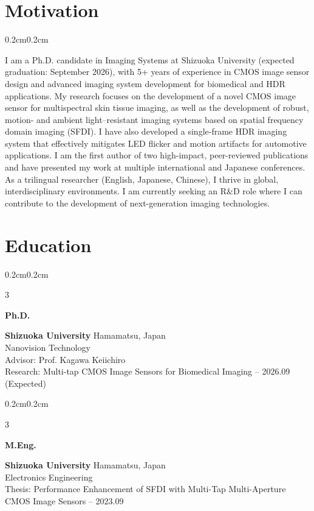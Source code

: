 \documentclass[10pt, letterpaper]{article}
\newenvironment{onecolentry}{
    \begin{adjustwidth}{0.2cm}{0.2cm}
}{\end{adjustwidth}}
\newenvironment{threecolentry}[3][]{
    \onecolentry
    \def\thirdColumn{#3}
    \setcolumnwidth{1cm, \fill, 3.2cm}
    \begin{paracol}{3}
    {\raggedright #2} \switchcolumn
}{\switchcolumn \raggedleft \thirdColumn \end{paracol} \endonecolentry}
\begin{document}

 \section{Motivation}
        \begin{onecolentry}
I am a Ph.D. candidate in Imaging Systems at Shizuoka University (expected graduation: September 2026), with 5+ years of experience in CMOS image sensor design and advanced imaging system development for biomedical and HDR applications. My research focuses on the development of a novel CMOS image sensor for multispectral skin tissue imaging, as well as the development of robust, motion- and ambient light–resistant imaging systems based on spatial frequency domain imaging (SFDI). I have also developed a single-frame HDR imaging system that effectively mitigates LED flicker and motion artifacts for automotive applications. I am the first author of two high-impact, peer-reviewed publications and have presented my work at multiple international and Japanese conferences. As a trilingual researcher (English, Japanese, Chinese), I thrive in global, interdisciplinary environments. I am currently seeking an R\&D role where I can contribute to the development of next-generation imaging technologies.

        \end{onecolentry}

    \section{Education}
    \begin{threecolentry}{\textbf{Ph.D.}}{2023.10 – 2026.09 (Expected)}
        \textbf{Shizuoka University} \textbar{}  Hamamatsu, Japan \\ Nanovision Technology \\ Advisor: Prof. Kagawa Keiichiro \\ Research: Multi-tap CMOS Image Sensors for Biomedical Imaging
    \end{threecolentry}

    \begin{threecolentry}{\textbf{M.Eng.}}{2021.10 – 2023.09}
        \textbf{Shizuoka University} \textbar{}  Hamamatsu, Japan \\ Electronics Engineering \\
        Thesis: Performance Enhancement of SFDI with Multi-Tap Multi-Aperture CMOS Image Sensors
    \end{threecolentry}
\end{document}
